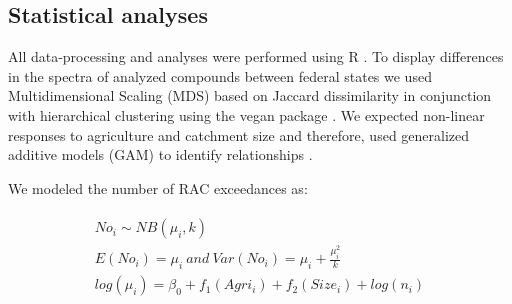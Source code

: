 \documentclass[journal=esthag,manuscript=article]{achemso}
\begin{document}
\subsection{Statistical analyses}

All data-processing and analyses were performed using R \citep{r_core_team_r:_2016}.
To display differences in the spectra of analyzed compounds between federal states we used Multidimensional Scaling (MDS) based on Jaccard dissimilarity in conjunction with hierarchical clustering using the vegan package \citep{oksanen_vegan:_2016}.
%
%
We expected non-linear responses to agriculture and catchment size and therefore, used generalized additive models (GAM) to identify relationships \citep{fewster_analysis_2000}.
%
%

We modeled the number of RAC exceedances as:
%
%

\begin{align}
\begin{split}
  No_i \sim NB(\mu_i, k) \\
  E(No_i) = \mu_i~and~Var(No_i) = \mu_i + \frac{\mu_i^2}{k} \\
  log(\mu_i)= \beta_0 + f_1(Agri_i) + f_2(Size_i) + log(n_i) \\
\end{split}
\end{align}
\end{document}
